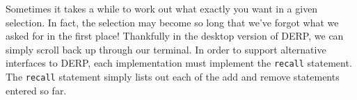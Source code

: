 Sometimes it takes a while to work out what exactly you want in a given selection. In fact, the selection may become so long that we’ve forgot what we asked for in the first place! Thankfully in the desktop version of DERP, we can simply scroll back up through our terminal. In order to support alternative interfaces to DERP, each implementation must implement the \texttt{recall} statement. The \texttt{recall} statement simply lists out each of the add and remove statements entered so far.
